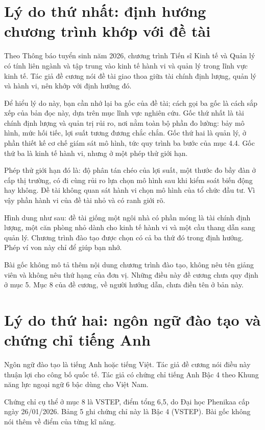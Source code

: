 \section{Lý do thứ nhất: định hướng chương trình khớp với đề tài}

Theo Thông báo tuyển sinh năm 2026, chương trình Tiến sĩ Kinh tế và Quản lý có tính liên ngành và tập trung vào kinh tế hành vi và quản lý trong lĩnh vực kinh tế. Tác giả đề cương nói đề tài giao thoa giữa tài chính định lượng, quản lý và hành vi, nên khớp với định hướng đó.

Để hiểu lý do này, bạn cần nhớ lại ba gốc của đề tài; cách gọi ba gốc là cách sắp xếp của bản đọc này, dựa trên mục lĩnh vực nghiên cứu. Gốc thứ nhất là tài chính định lượng và quản trị rủi ro, nơi nằm toàn bộ phần đo lường: bảy mô hình, mức hối tiếc, lợi suất tương đương chắc chắn. Gốc thứ hai là quản lý, ở phần thiết kế cơ chế giám sát mô hình, tức quy trình ba bước của mục 4.4. Gốc thứ ba là kinh tế hành vi, nhưng ở một phép thử giới hạn.

Phép thử giới hạn đó là: độ phân tán chéo của lợi suất, một thước đo bầy đàn ở cấp thị trường, có đi cùng rủi ro lựa chọn mô hình sau khi kiểm soát biến động hay không. Đề tài không quan sát hành vi chọn mô hình của tổ chức đầu tư. Vì vậy phần hành vi của đề tài nhỏ và có ranh giới rõ.

Hình dung như sau: đề tài giống một ngôi nhà có phần móng là tài chính định lượng, một căn phòng nhỏ dành cho kinh tế hành vi và một cầu thang dẫn sang quản lý. Chương trình đào tạo được chọn có cả ba thứ đó trong định hướng. Phép ví von này chỉ để giúp bạn nhớ.

Bài gốc không mô tả thêm nội dung chương trình đào tạo, không nêu tên giảng viên và không nêu thứ hạng của đơn vị. Những điều này đề cương chưa quy định ở mục 5. Mục 8 của đề cương, về người hướng dẫn, chưa điền tên ở bản này.

\section{Lý do thứ hai: ngôn ngữ đào tạo và chứng chỉ tiếng Anh}

Ngôn ngữ đào tạo là tiếng Anh hoặc tiếng Việt. Tác giả đề cương nói điều này thuận lợi cho công bố quốc tế. Tác giả có chứng chỉ tiếng Anh Bậc 4 theo Khung năng lực ngoại ngữ 6 bậc dùng cho Việt Nam.

Chứng chỉ cụ thể ở mục 8 là VSTEP, điểm tổng 6,5, do Đại học Phenikaa cấp ngày 26/01/2026. Bảng 5 ghi chứng chỉ này là Bậc 4 (VSTEP). Bài gốc không nói thêm về điểm của từng kĩ năng.

